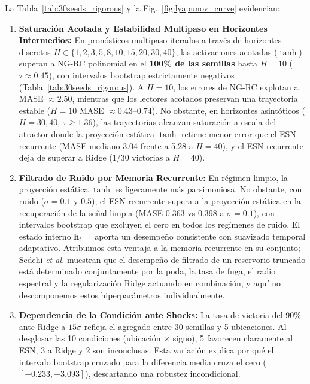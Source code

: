 \documentclass[aip,cha,reprint,amsmath,amssymb]{revtex4-2}
\begin{document}
La Tabla~\ref{tab:30seeds_rigorous} y la Fig.~\ref{fig:lyapunov_curve} evidencian:
\begin{enumerate}
    \item \textbf{Saturación Acotada y Estabilidad Multipaso en Horizontes Intermedios:} En pronósticos multipaso iterados a través de horizontes discretos $H \in \{1, 2, 3, 5, 8, 10, 15, 20, 30, 40\}$, las activaciones acotadas ($\tanh$) superan a NG-RC polinomial en el \textbf{100\% de las semillas} hasta $H=10$ ($\tau \approx 0.45$), con intervalos bootstrap estrictamente negativos (Tabla~\ref{tab:30seeds_rigorous}). A $H=10$, los errores de NG-RC explotan a MASE $\approx 2.50$, mientras que los lectores acotados preservan una trayectoria estable ($H=10$ MASE $\approx 0.43$--$0.74$). No obstante, en horizontes asintóticos ($H=30, 40$, $\tau \ge 1.36$), las trayectorias alcanzan saturación a escala del atractor donde la proyección estática $\tanh$ retiene menor error que el ESN recurrente (MASE mediano 3.04 frente a 5.28 a $H=40$), y el ESN recurrente deja de superar a Ridge (1/30 victorias a $H=40$).
    \item \textbf{Filtrado de Ruido por Memoria Recurrente:} En régimen limpio, la proyección estática $\tanh$ es ligeramente más parsimoniosa. No obstante, con ruido ($\sigma=0.1$ y $0.5$), el ESN recurrente supera a la proyección estática en la recuperación de la señal limpia (MASE 0.363 vs 0.398 a $\sigma=0.1$), con intervalos bootstrap que excluyen el cero en todos los regímenes de ruido. El estado interno $\mathbf{h}_{t-1}$ aporta un desempeño consistente con suavizado temporal adaptativo. Atribuimos esta ventaja a la memoria recurrente en su conjunto; Sedehi \emph{et al.} \cite{sedehi2025denoising} muestran que el desempeño de filtrado de un reservorio truncado está determinado conjuntamente por la poda, la tasa de fuga, el radio espectral y la regularización Ridge actuando en combinación, y aquí no descomponemos estos hiperparámetros individualmente.
    \item \textbf{Dependencia de la Condición ante Shocks:} La tasa de victoria del 90\% ante Ridge a $15\sigma$ refleja el agregado entre 30 semillas y 5 ubicaciones. Al desglosar las 10 condiciones (ubicación $\times$ signo), 5 favorecen claramente al ESN, 3 a Ridge y 2 son inconclusas. Esta variación explica por qué el intervalo bootstrap cruzado para la diferencia media cruza el cero ($[-0.233, +3.093]$), descartando una robustez incondicional.
\end{enumerate}

\end{document}

